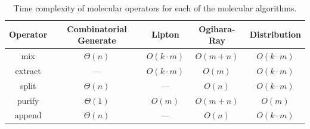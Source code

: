 		\begin{table}[htdp]
				\caption{Time complexity of molecular operators for each of the molecular algorithms.}
				\begin{center}
				\begin{tabular}{|c|c|c|c|c|}
					\hline
					\textbf{ Operator} & {\sc Combinatorial Generate} & {\sc Lipton}           & {\sc Ogihara-Ray}  & {\sc Distribution} \\ \hline
					mix	               & $\Theta(n)$                  & $O(k\cdot m)$          & $O(m + n)$         & $O(k\cdot m)$ \\
					extract            & ---                          & $O(k\cdot m)$          & $O(m)$             & $O(k\cdot m)$ \\
					split	           & $\Theta(n)$                  & ---                    & $O(n)$             & $O(k\cdot m)$ \\
					purify	           & $\Theta(1)$                  & $O(m)$                 & $O(m + n)$         & $O(m)$ \\
					append	           & $\Theta(n)$                  & ---                    & $O(n)$             & $O(k\cdot m)$ \\
					\hline
				\end{tabular}
				\end{center}
				\label{timeComplexityMolecularOperators}
				\end{table}%
		
			\FloatBarrier		
		
		




		
	
